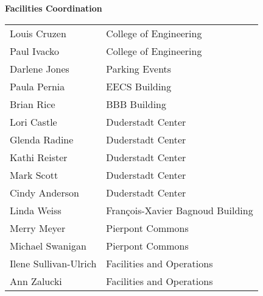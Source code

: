 \documentclass[twoside]{article}
\begin{document}
    { \fontsize{14}{17}\selectfont \bf Facilities Coordination}\\\begin{tabular}{p{2in}l}
    Louis Cruzen	&	College of Engineering\\
        Paul Ivacko	&	College of Engineering\\
        Darlene Jones	&	Parking Events\\
        Paula Pernia	&	EECS Building\\
        Brian Rice	&	BBB Building\\
        Lori Castle	&	Duderstadt Center\\
        Glenda Radine	&	Duderstadt Center\\
        Kathi Reister	&	Duderstadt Center\\
        Mark Scott	&	Duderstadt Center\\
        Cindy Anderson	&	Duderstadt Center\\
        Linda Weiss	&	François-Xavier Bagnoud Building\\
        Merry Meyer	&	Pierpont Commons\\
        Michael Swanigan	&	Pierpont Commons\\
        Ilene Sullivan-Ulrich	&	Facilities and Operations\\
        Ann Zalucki	&	Facilities and Operations\\
        \end{tabular}\\[1em]
    
\end{document}
